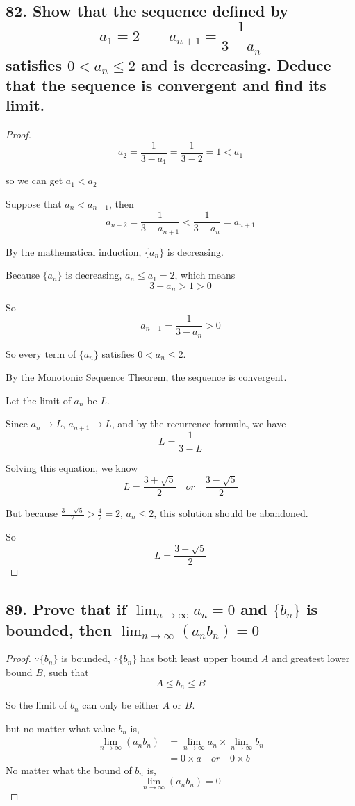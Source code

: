\documentclass{article}
\begin{document}
    \subsection*{82. Show that the sequence defined by $$a_1 = 2 \qquad a_{n+1} = \frac{1}{3 - a_n}$$ satisfies $0 < a_n \leq 2$ and is decreasing. Deduce that the sequence is convergent and find its limit.}
    \begin{proof}
        

        $$a_2 = \frac{1}{3 - a_1} = \frac{1}{3 - 2} = 1 < a_1$$

        so we can get $a_1 < a_2$

        Suppose that $a_n < a_{n + 1}$, then $$a_{n + 2} = \frac{1}{3 - a_{n+1}} < \frac{1}{3 - a_n} = a_{n+1}$$

        By the mathematical induction, $\{a_n\}$ is decreasing.

        Because $\{a_n\}$ is decreasing, $a_n \leq a_1 = 2$, which means $$3 - a_n > 1 > 0$$

        So $$a_{n+1} = \frac{1}{3 - a_n} > 0$$

        So every term of $\{a_n\}$ satisfies $0 < a_n \leq 2$.
        

        By the Monotonic Sequence Theorem, the sequence is convergent.

        Let the limit of $a_n$ be $L$.
        
        Since $a_n \to L$, $a_{n+1} \to L$, and by the recurrence formula, we have $$L = \frac{1}{3 - L}$$

        Solving this equation, we know $$L = \frac{3 + \sqrt{5}}{2} \quad or \quad \frac{3 - \sqrt{5}}{2} $$

        But because $\frac{3 + \sqrt{5}}{2} > \frac{4}{2} = 2$, $a_n \leq 2$, this solution should be abandoned.

        So $$L = \frac{3 - \sqrt{5}}{2}$$

    \end{proof}

    \subsection*{89. Prove that if $\lim_{n \to \infty } a_n = 0$ and $\{b_n\}$ is bounded, then $\lim_{n \to \infty}(a_nb_n) = 0$}

    \begin{proof}
        $\because \{b_n\}$ is bounded, $\therefore \{b_n\}$ has both least upper bound $A$ and greatest lower bound $B$, such that $$A \leq b_n \leq B$$

        So the limit of $b_n$ can only be either $A$ or $B$.

        but no matter what value $b_n$ is, 
        $$
        \begin{aligned}
            \lim_{n\to \infty}(a_nb_n) &= \lim_{n\to \infty}a_n \times \lim_{n\to \infty}b_n \\
            &= 0 \times a \quad or \quad 0 \times b
        \end{aligned}
        $$
        No matter what the bound of $b_n$ is, $$\lim_{n \to \infty}(a_nb_n) = 0$$
    \end{proof}
\end{document}
